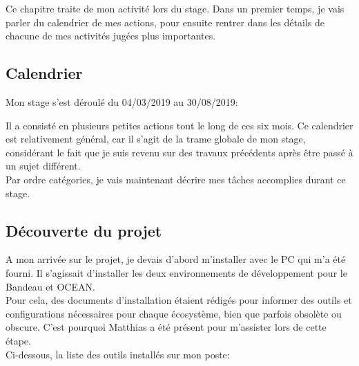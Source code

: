 \documentclass{rapport}
\begin{document}
Ce chapitre traite de mon activité lors du stage. Dans un premier temps, je vais parler du calendrier de mes actions, pour ensuite rentrer dans les détails de chacune de mes activités jugées plus importantes.

\subsection{Calendrier}

Mon stage s'est déroulé du 04/03/2019 au 30/08/2019:\\


Il a consisté en plusieurs petites actions tout le long de ces six mois. Ce calendrier est relativement général, car il s'agit de la trame globale de mon stage, considérant le fait  que je suis revenu sur des travaux précédents après être passé à un sujet différent.\\

Par ordre catégories, je vais maintenant décrire mes tâches accomplies durant ce stage. 

\newpage
\subsection{Découverte du projet}

A mon arrivée sur le projet, je devais d'abord m'installer avec le PC qui m'a été fourni. Il s'agissait d'installer les deux environnements de développement pour le Bandeau et OCEAN.\\
Pour cela, des documents d'installation étaient rédigés pour informer des outils et configurations nécessaires pour chaque écosystème, bien que parfois obsolète ou obscure. C'est pourquoi Matthias a été présent pour m'assister lors de cette étape.\\

Ci-dessous, la liste des outils installés sur mon poste:
\end{document}
